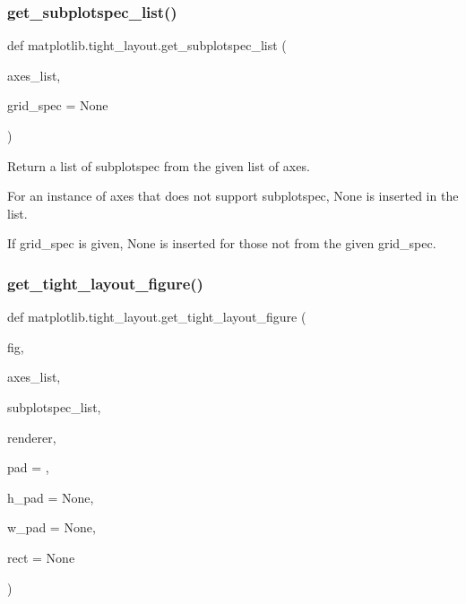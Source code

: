 \subsubsection{\texorpdfstring{get\+\_\+subplotspec\+\_\+list()}{get\_subplotspec\_list()}}
{\footnotesize\ttfamily def matplotlib.\+tight\+\_\+layout.\+get\+\_\+subplotspec\+\_\+list (\begin{DoxyParamCaption}\item[{}]{axes\+\_\+list,  }\item[{}]{grid\+\_\+spec = {\ttfamily None} }\end{DoxyParamCaption})}

\begin{DoxyVerb}Return a list of subplotspec from the given list of axes.

For an instance of axes that does not support subplotspec, None is inserted
in the list.

If grid_spec is given, None is inserted for those not from the given
grid_spec.
\end{DoxyVerb}
 \mbox{\label{namespacematplotlib_1_1tight__layout_acfa6d3d8d24026f694a08798f67f6561}} 
\subsubsection{\texorpdfstring{get\+\_\+tight\+\_\+layout\+\_\+figure()}{get\_tight\_layout\_figure()}}
{\footnotesize\ttfamily def matplotlib.\+tight\+\_\+layout.\+get\+\_\+tight\+\_\+layout\+\_\+figure (\begin{DoxyParamCaption}\item[{}]{fig,  }\item[{}]{axes\+\_\+list,  }\item[{}]{subplotspec\+\_\+list,  }\item[{}]{renderer,  }\item[{}]{pad = {},  }\item[{}]{h\+\_\+pad = {\ttfamily None},  }\item[{}]{w\+\_\+pad = {\ttfamily None},  }\item[{}]{rect = {\ttfamily None} }\end{DoxyParamCaption})}


